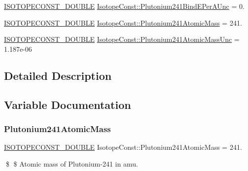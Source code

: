 \begin{DoxyCompactItemize}
\mbox{\hyperlink{group___isotope_const-_macros_ga8f45a7272ce02c0b4c65c44636ed719a}{I\+S\+O\+T\+O\+P\+E\+C\+O\+N\+S\+T\+\_\+\+D\+O\+U\+B\+LE}} \mbox{\hyperlink{group___isotope_const-_plutonium-_pu241_ga6a7cc38d503d627ec6bdf5b3d9c4453f}{Isotope\+Const\+::\+Plutonium241\+Bind\+E\+Per\+A\+Unc}} = 0.
\item 
\mbox{\hyperlink{group___isotope_const-_macros_ga8f45a7272ce02c0b4c65c44636ed719a}{I\+S\+O\+T\+O\+P\+E\+C\+O\+N\+S\+T\+\_\+\+D\+O\+U\+B\+LE}} \mbox{\hyperlink{group___isotope_const-_plutonium-_pu241_gaf9346858da390ce43b24bae0e99c7b3a}{Isotope\+Const\+::\+Plutonium241\+Atomic\+Mass}} = 241.
\item 
\mbox{\hyperlink{group___isotope_const-_macros_ga8f45a7272ce02c0b4c65c44636ed719a}{I\+S\+O\+T\+O\+P\+E\+C\+O\+N\+S\+T\+\_\+\+D\+O\+U\+B\+LE}} \mbox{\hyperlink{group___isotope_const-_plutonium-_pu241_gaa5a6fff57a4a9f40a34cd9b80c5ffb1a}{Isotope\+Const\+::\+Plutonium241\+Atomic\+Mass\+Unc}} = 1.\+187e-\/06
\end{DoxyCompactItemize}


\subsection{Detailed Description}


\subsection{Variable Documentation}
\mbox{\label{group___isotope_const-_plutonium-_pu241_gaf9346858da390ce43b24bae0e99c7b3a}} 
\subsubsection{\texorpdfstring{Plutonium241\+Atomic\+Mass}{Plutonium241AtomicMass}}
{\footnotesize\ttfamily \mbox{\hyperlink{group___isotope_const-_macros_ga8f45a7272ce02c0b4c65c44636ed719a}{I\+S\+O\+T\+O\+P\+E\+C\+O\+N\+S\+T\+\_\+\+D\+O\+U\+B\+LE}} Isotope\+Const\+::\+Plutonium241\+Atomic\+Mass = 241.}

\$ \$ Atomic mass of Plutonium-\/241 in amu. \mbox{\label{group___isotope_const-_plutonium-_pu241_gaa5a6fff57a4a9f40a34cd9b80c5ffb1a}} 

